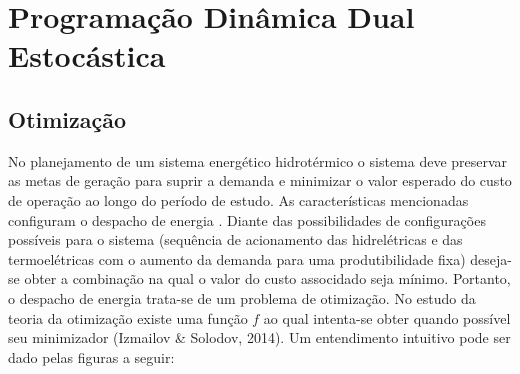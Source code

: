 \documentclass[12pt,fleqn]{article}
\begin{document}
\section{Programa\c c\~ao Din\^amica Dual Estoc\'astica}
\subsection{Otimiza\c c\~ao}
No planejamento de um sistema energ\'etico hidrot\'ermico o sistema deve preservar as metas de gera\c c\~ao para suprir a demanda e minimizar o valor esperado do custo de
opera\c c\~ao ao longo do per\'iodo de estudo. As caracter\'isticas mencionadas configuram o despacho de energia
. Diante das possibilidades de configura\c c\~oes poss\'iveis para o sistema (sequ\^encia de acionamento das hidrel\'etricas e das termoel\'etricas com o aumento da demanda para uma produtibilidade fixa) deseja-se obter a combina\c
c\~ao na qual o valor do custo
associdado seja m\'inimo. Portanto, o despacho de energia trata-se de um problema de otimiza\c c\~ao. No estudo da
teoria da otimiza\c c\~ao existe uma fun\c c\~ao $f$ ao qual intenta-se obter
quando poss\'ivel seu minimizador (Izmailov \& Solodov, 2014). Um entendimento intuitivo pode ser dado pelas figuras a seguir:
\end{document}

